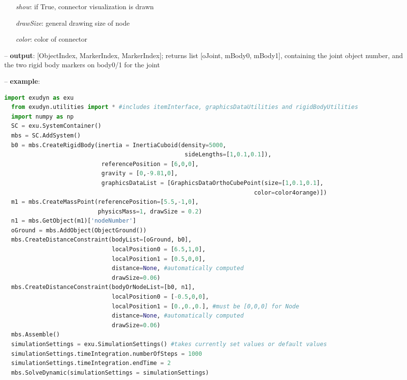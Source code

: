 \begin{itemize}[leftmargin=0.7cm]
\begin{itemize}[leftmargin=1.2cm]
\item[]{\it show}: if True, connector visualization is drawn
\item[]{\it drawSize}: general drawing size of node
\item[]{\it color}: color of connector
\end{itemize}
\item[--]
{\bf output}: [ObjectIndex, MarkerIndex, MarkerIndex]; returns list [oJoint, mBody0, mBody1], containing the joint object number, and the two rigid body markers on body0/1 for the joint
\item[--]
{\bf example}: \vspace{-12pt}\ei\begin{lstlisting}[language=Python, xleftmargin=36pt]
  import exudyn as exu
  from exudyn.utilities import * #includes itemInterface, graphicsDataUtilities and rigidBodyUtilities
  import numpy as np
  SC = exu.SystemContainer()
  mbs = SC.AddSystem()
  b0 = mbs.CreateRigidBody(inertia = InertiaCuboid(density=5000,
                                                    sideLengths=[1,0.1,0.1]),
                            referencePosition = [6,0,0],
                            gravity = [0,-9.81,0],
                            graphicsDataList = [GraphicsDataOrthoCubePoint(size=[1,0.1,0.1],
                                                                        color=color4orange)])
  m1 = mbs.CreateMassPoint(referencePosition=[5.5,-1,0],
                           physicsMass=1, drawSize = 0.2)
  n1 = mbs.GetObject(m1)['nodeNumber']
  oGround = mbs.AddObject(ObjectGround())
  mbs.CreateDistanceConstraint(bodyList=[oGround, b0],
                               localPosition0 = [6.5,1,0],
                               localPosition1 = [0.5,0,0],
                               distance=None, #automatically computed
                               drawSize=0.06)
  mbs.CreateDistanceConstraint(bodyOrNodeList=[b0, n1],
                               localPosition0 = [-0.5,0,0],
                               localPosition1 = [0.,0.,0.], #must be [0,0,0] for Node
                               distance=None, #automatically computed
                               drawSize=0.06)
  mbs.Assemble()
  simulationSettings = exu.SimulationSettings() #takes currently set values or default values
  simulationSettings.timeIntegration.numberOfSteps = 1000
  simulationSettings.timeIntegration.endTime = 2
  mbs.SolveDynamic(simulationSettings = simulationSettings)
\end{lstlisting}\vspace{-24pt}\bi\item[]\vspace{-24pt}\vspace{12pt}\end{itemize}
%


